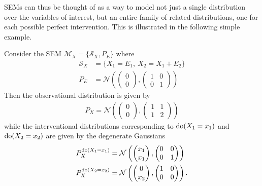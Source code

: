 SEMs can thus be thought of as a way to model not just a single distribution over the variables of interest, but an entire family of related distributions, one for each possible perfect intervention.
This is illustrated in the following simple example.

\medskip

\begin{example}\label{example:causality-simple-sem}
Consider the SEM $\mathcal{M}_X=\{\mathcal{S}_X, P_E\}$ where
%
\begin{align*}
\mathcal{S}_X &= \big\{  X_1 = E_1,\ X_2 = X_1 + E_2\big\} \\
P_E &= \mathcal{N}\left(\begin{pmatrix}
0 \\
0 
\end{pmatrix}, 
\begin{pmatrix}
1 & 0 \\
0 & 1
\end{pmatrix}\right)
\end{align*}
%
Then the observational distribution is given by 
%
\begin{align*}
P_X = \mathcal{N}\left(\begin{pmatrix}
0 \\
0 
\end{pmatrix}, 
\begin{pmatrix}
1 & 1 \\
1 & 2
\end{pmatrix}\right)
\end{align*}
%
while the interventional distributions corresponding to $\operatorname{do}(X_1 = x_1)$ and $\operatorname{do}(X_2 = x_2)$ are given by the degenerate Gaussians
%
\begin{align*}
P^{\operatorname{do}(X_1 = x_1)}_X &= \mathcal{N}\left(\begin{pmatrix}
x_1 \\
x_1 
\end{pmatrix}, 
\begin{pmatrix}
0 & 0 \\
0 & 1
\end{pmatrix}\right) \\
P^{\operatorname{do}(X_2 = x_2)}_X &= \mathcal{N}\left(\begin{pmatrix}
0 \\
x_2 
\end{pmatrix}, 
\begin{pmatrix}
1 & 0 \\
0 & 0
\end{pmatrix}\right).
\end{align*}
\end{example}

